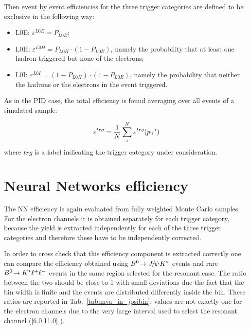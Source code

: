 Then event by event efficiencies for the three trigger categories are defined to be exclusive in the following way:
%
\begin{itemize}
\item L0E: $\varepsilon^{L0E} = P_{L0E}$;
\item L0H: $\varepsilon^{L0H} = P_{L0H}\cdot(1 - P_{L0E})$, namely the probability that at least one hadron triggered but none of the electrons;
\item L0I: $\varepsilon^{L0I} = (1-P_{L0H})\cdot(1 - P_{L0E})$, namely the probability that neither the hadrons or the electrons in the event triggered.
\end{itemize}
%
As in the PID case, the total efficiency is found averaging over all events of a simulated sample:

\begin{equation}
\varepsilon^{trg} = \frac{1}{N} \sum_i^N \varepsilon^{trg}(\mbox{$p_{\rm T}$}^i)
\end{equation}
\noindent
where $trg$ is a label indicating the trigger category under consideration.


\section{Neural Networks efficiency}
\label{sec:Rkst_mva_eff}

The NN efficiency is again evaluated from fully weighted Monte Carlo samples. 
For the electron channels it is obtained separately for each trigger category,
because the yield is extracted independently for each of the three trigger categories
and therefore these have to be independently corrected.

In order to cross check that this efficiency component is extracted correctly
one can compare the efficiency obtained using $\decay{\Bz}{\jpsi\Kstar}$ events
and rare ${{B}^0}\!\rightarrow {\ensuremath{{K}^*}} \ell^+\ell^-$ events in the same \qsq region selected
for the resonant case. The ratio between the two should be close to 1 with
small deviations due the fact that the bin width is finite and the events are distributed
differently inside the bin. These ratios are reported in Tab.~\ref{tab:mva_in_jpsibin};
values are not exactly one for the electron channels due to the very large \qsq interval
used to select the resonant channel ([6.0,11.0] \gevgevcccc).

